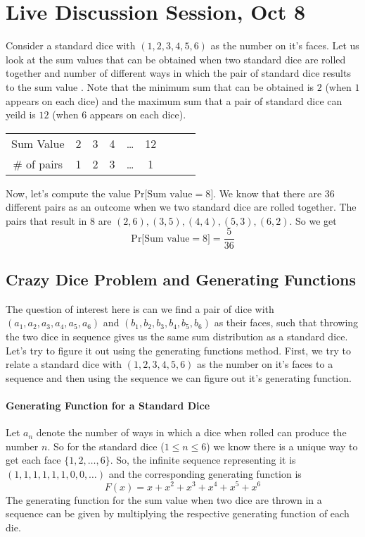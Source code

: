 \section{Live Discussion Session, Oct 8}

Consider a standard dice with $(1,2,3,4,5,6)$ as the number on it's faces. Let us look at the sum values that can be obtained when two standard dice are rolled together and number of different ways in which the pair of standard  dice results to the sum value . Note that the minimum sum that can be obtained is $2$ (when  $1$ appears on each dice) and the maximum sum that a pair of standard dice can yeild is $12$ (when  $6$ appears on each dice).

\begin{center}
\begin{tabular}{c c c c c c c c c }
 Sum Value & 2 & 3 & 4 & \dots & 12   \\ 
 \# of pairs & 1 & 2 & 3 & \dots & 1  \\  
\end{tabular}
\end{center}

Now, let's compute the value $\text{Pr[Sum value} = 8]$. We know that there are $36$ different pairs as an outcome when we two standard dice are rolled together. The pairs that result in $8$ are $(2,6),(3,5),(4,4),(5,3),(6,2)$. So we get
$$\text{Pr[Sum value} = 8]=\frac{5}{36}$$
\subsection{Crazy Dice Problem and Generating Functions}
The question of interest here is can we find a pair of dice with
$(a_1,a_2,a_3,a_4,a_5,a_6)$ and $(b_1,b_2,b_3,b_4,b_5,b_6)$ as their faces, such that throwing the two dice in sequence gives us the same sum distribution as a standard dice.
Let's try to figure it out using the generating functions method.
First, we try to relate a standard dice with $(1,2,3,4,5,6)$ as the number on it's faces to a sequence and then using the sequence we can figure out it's generating function. 
\paragraph{Generating Function for a Standard Dice} Let $a_n$ denote the number of ways in which a dice when rolled can produce the number $n$. So for the standard dice ($1\le n \le 6$) we know there is a unique way to get each face $\{1,2,\dots,6\}$. So, the infinite sequence representing it is $(1,1,1,1,1,1,0,0,\dots)$ and the corresponding generating function is $$F(x)=x+x^2+x^3+x^4+x^5+x^6$$
The generating function for the sum value when two dice are thrown in a sequence can be given by multiplying the respective generating function of each die. 

